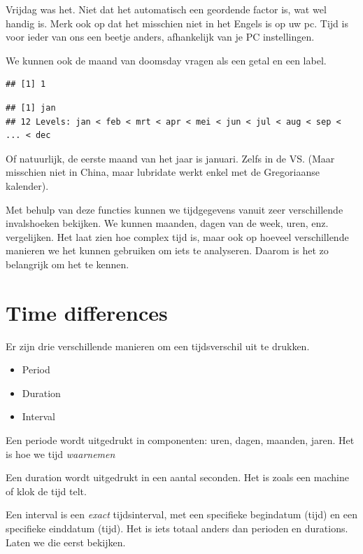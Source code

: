 \documentclass[]{tufte-book}
\providecommand{\tightlist}{%
  \setlength{\itemsep}{0pt}\setlength{\parskip}{0pt}}
\begin{document}
Vrijdag was het. Niet dat het automatisch een geordende factor is, wat wel handig is. Merk ook op dat het misschien niet in het Engels is op uw pc. Tijd is voor ieder van ons een beetje anders, afhankelijk van je PC instellingen.

We kunnen ook de maand van doomsday vragen als een getal en een label.

\begin{verbatim}
## [1] 1
\end{verbatim}

\begin{verbatim}
## [1] jan
## 12 Levels: jan < feb < mrt < apr < mei < jun < jul < aug < sep < ... < dec
\end{verbatim}

Of natuurlijk, de eerste maand van het jaar is januari. Zelfs in de VS. (Maar misschien niet in China, maar lubridate werkt enkel met de Gregoriaanse kalender).

Met behulp van deze functies kunnen we tijdgegevens vanuit zeer verschillende invalshoeken bekijken. We kunnen maanden, dagen van de week, uren, enz. vergelijken. Het laat zien hoe complex tijd is, maar ook op hoeveel verschillende manieren we het kunnen gebruiken om iets te analyseren. Daarom is het zo belangrijk om het te kennen.

\hypertarget{time-differences}{%
\section{Time differences}\label{time-differences}}

Er zijn drie verschillende manieren om een tijdsverschil uit te drukken.

\begin{itemize}
\tightlist
\item
  Period
\item
  Duration
\item
  Interval
\end{itemize}

Een periode wordt uitgedrukt in componenten: uren, dagen, maanden, jaren. Het is hoe we tijd \emph{waarnemen}

Een duration wordt uitgedrukt in een aantal seconden. Het is zoals een machine of klok de tijd telt.

Een interval is een \emph{exact} tijdsinterval, met een specifieke begindatum (tijd) en een specifieke einddatum (tijd). Het is iets totaal anders dan perioden en durations. Laten we die eerst bekijken.
\end{document}

